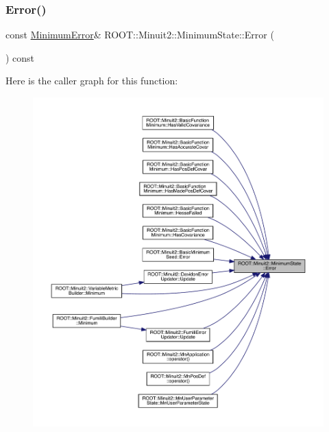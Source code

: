 \mbox{\label{classROOT_1_1Minuit2_1_1MinimumState_a28d9bb6148e54a7bf4ca15ca9548fe23}} 
\subsubsection{\texorpdfstring{Error()}{Error()}\hspace{0.1cm}{\footnotesize\ttfamily [2/2]}}
{\footnotesize\ttfamily const \mbox{\hyperlink{classROOT_1_1Minuit2_1_1MinimumError}{Minimum\+Error}}\& R\+O\+O\+T\+::\+Minuit2\+::\+Minimum\+State\+::\+Error (\begin{DoxyParamCaption}{ }\end{DoxyParamCaption}) const\hspace{0.3cm}{\ttfamily [inline]}}

Here is the caller graph for this function\+:\nopagebreak
\begin{figure}[H]
\begin{center}
\leavevmode
\includegraphics[width=350pt]{db/dcd/classROOT_1_1Minuit2_1_1MinimumState_a28d9bb6148e54a7bf4ca15ca9548fe23_icgraph}
\end{center}
\end{figure}
\mbox{\label{classROOT_1_1Minuit2_1_1MinimumState_aad936fc04cd24c5b769748b93ded0ab9}} 
